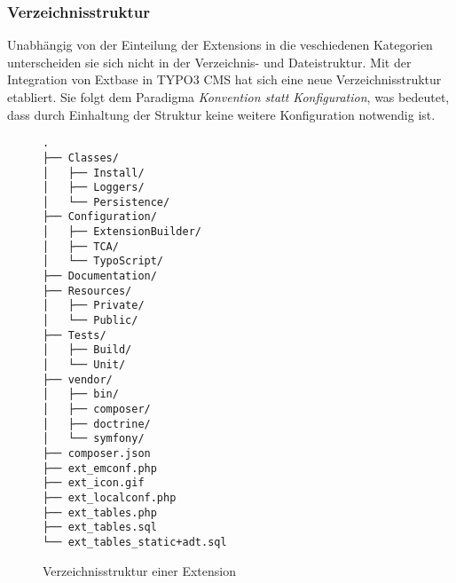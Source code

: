 \subsubsection{Verzeichnisstruktur}
Unabhängig von der Einteilung der Extensions in die veschiedenen Kategorien unterscheiden sie sich nicht in der Verzeichnis- und Dateistruktur. Mit der Integration von Extbase in TYPO3 CMS hat sich eine neue Verzeichnisstruktur etabliert. Sie folgt dem Paradigma \textit{Konvention statt Konfiguration}, was bedeutet, dass durch Einhaltung der Struktur keine weitere Konfiguration notwendig ist.
\begin{figure}[t]
\begin{Verbatim}[samepage=true]
.
├── Classes/
│   ├── Install/
│   ├── Loggers/
│   └── Persistence/
├── Configuration/
│   ├── ExtensionBuilder/
│   ├── TCA/
│   └── TypoScript/
├── Documentation/
├── Resources/
│   ├── Private/
│   └── Public/
├── Tests/
│   ├── Build/
│   └── Unit/
├── vendor/
│   ├── bin/
│   ├── composer/
│   ├── doctrine/
│   └── symfony/
├── composer.json
├── ext_emconf.php
├── ext_icon.gif
├── ext_localconf.php
├── ext_tables.php
├── ext_tables.sql
└── ext_tables_static+adt.sql
\end{Verbatim}
\caption{Verzeichnisstruktur einer Extension}
\label{pic:extensionFolderStructure}
\end{figure}
\pagebreak
